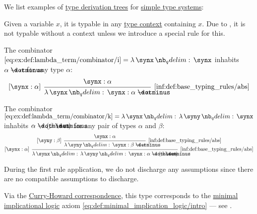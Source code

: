 \begin{example}\label{ex:def:type_derivation_tree}
  We list examples of \hyperref[def:type_derivation_tree]{type derivation trees} for \hyperref[def:simple_type_system]{simple type systems}:
  \begin{thmenum}
     Given a variable \( x \), it is typable in any \hyperref[def:type_context]{type context} containing \( x \). Due to , it is not typable without a context unless we introduce a special rule for this.

     The combinator \( \ref{eq:ex:def:lambda_term/combinator/i} = \qabs \synx \synx \) inhabits \( \alpha \synimplies \alpha \) for any type \( \alpha \):
    \begin{equation*}
      \begin{prooftree}
        \hypo{ \synx: \alpha }
        \infer[left label=\( [\synx: \alpha] \)]1[\ref{inf:def:base_typing_rules/abs}]{ \qabs \synx \synx: \alpha \synimplies \alpha }
      \end{prooftree}
    \end{equation*}

     The combinator \( \ref{eq:ex:def:lambda_term/combinator/k} = \qabs \synx \qabs \syny \synx \) inhabits \( \alpha \synimplies (\beta \synimplies \alpha) \) for any pair of types \( \alpha \) and \( \beta \):
    \begin{equation*}
      \begin{prooftree}
        \hypo{ \synx: \alpha }
        \infer[left label=\( [\syny: \beta] \)]1[\ref{inf:def:base_typing_rules/abs}]{ \qabs \syny \synx: \beta \synimplies \alpha }
        \infer[left label=\( [\synx: \alpha] \)]1[\ref{inf:def:base_typing_rules/abs}]{ \qabs \synx \qabs \syny \synx: \alpha \synimplies (\beta \synimplies \alpha) }
      \end{prooftree}
    \end{equation*}

    During the first rule application, we do not discharge any assumptions since there are no compatible assumptions to discharge.

    Via the \hyperref[con:curry_howard_correspondence]{Curry-Howard correspondence}, this type corresponds to the \hyperref[def:minimal_implication_logic]{minimal implicational logic} axiom \eqref{eq:def:minimal_implication_logic/intro} --- see .


\end{thmenum}
\end{example}
